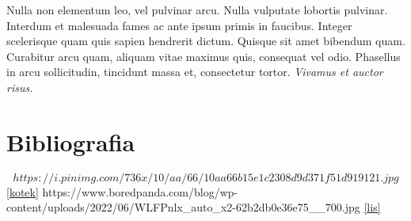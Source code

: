 \documentclass[12pt,a4paper]{article}
\begin{document}
Nulla non elementum leo, vel pulvinar arcu. Nulla vulputate lobortis pulvinar. Interdum et malesuada fames ac ante ipsum primis in faucibus. Integer scelerisque quam quis sapien hendrerit dictum. Quisque sit amet bibendum quam. Curabitur arcu quam, aliquam vitae maximus quis, consequat vel odio. Phasellus in arcu sollicitudin, tincidunt massa et, consectetur tortor. \textit{Vivamus et auctor risus.}

	
	\section{Bibliografia}
 \[https://i.pinimg.com/736x/10/aa/66/10aa66b15e1c2308d9d371f51d919121.jpg\] \ref{kotek}
https://www.boredpanda.com/blog/wp-content/uploads/2022/06/WLFPnlx_auto_x2-62b2db0e36e75__700.jpg \ref{lis}
\end{document}
